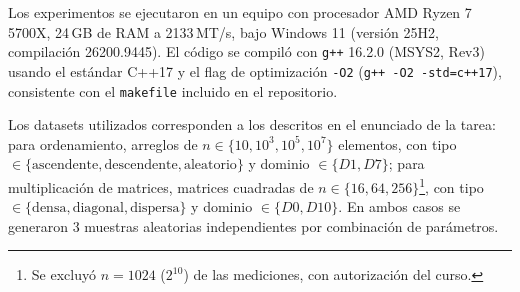 Los experimentos se ejecutaron en un equipo con procesador AMD Ryzen 7
5700X, 24\,GB de RAM a 2133\,MT/s, bajo Windows 11 (versión 25H2, compilación
26200.9445). El código se compiló con \texttt{g++} 16.2.0 (MSYS2,
Rev3) usando el estándar C++17 y el flag de optimización \texttt{-O2}
(\texttt{g++ -O2 -std=c++17}), consistente con el \texttt{makefile}
incluido en el repositorio.

Los datasets utilizados corresponden a los descritos en el enunciado de
la tarea: para ordenamiento, arreglos de $n \in \{10, 10^3, 10^5, 10^7\}$
elementos, con tipo $\in \{\text{ascendente}, \text{descendente},
\text{aleatorio}\}$ y dominio $\in \{D1, D7\}$; para multiplicación de
matrices, matrices cuadradas de $n \in \{16, 64, 256\}$\footnote{Se
excluyó $n=1024$ ($2^{10}$) de las mediciones, con autorización del
curso.}, con tipo $\in \{\text{densa}, \text{diagonal}, \text{dispersa}\}$
y dominio $\in \{D0, D10\}$. En ambos casos se generaron 3 muestras
aleatorias independientes por combinación de parámetros.